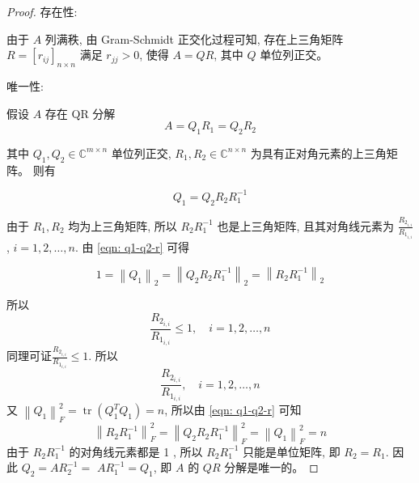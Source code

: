 \begin{proof}
    存在性: 
    
    由于 $A$ 列满秩, 由 Gram-Schmidt 正交化过程可知, 存在上三角矩阵 $R=\left[r_{i j}\right]_{n \times n}$ 满足 $r_{j j}>0$, 使得 $A=Q R$, 其中 $Q$ 单位列正交。

    唯一性: 
    
    假设 $A$ 存在 QR 分解
$$
A=Q_{1} R_{1}=Q_{2} R_{2}
$$

其中 $Q_{1}, Q_{2} \in \mathbb{C}^{m \times n}$ 单位列正交, $R_{1}, R_{2} \in \mathbb{C}^{n \times n}$ 为具有正对角元素的上三角矩阵。 则有

\begin{equation}
    \label{eqn: q1-q2-r}
    Q_{1}=Q_{2} R_{2} R_{1}^{-1}
\end{equation}


由于 $R_{1}, R_{2}$ 均为上三角矩阵, 所以 $R_{2} R_{1}^{-1}$ 也是上三角矩阵, 且其对角线元素为 $\frac{R_{2_{i,i}}}{R_{1_{i,i}}}$, $i=1,2, \ldots, n$. 由 \cref{eqn: q1-q2-r} 可得

$$
1=\left\|Q_{1}\right\|_{2}=\left\|Q_{2} R_{2} R_{1}^{-1}\right\|_{2}=\left\|R_{2} R_{1}^{-1}\right\|_{2}
$$

所以
$$
\frac{R_{2_{i,i}}}{R_{1_{i,i}}} \leq 1, \quad i=1,2, \ldots, n
$$
同理可证$\frac{R_{2_{i,i}}}{R_{1_{i,i}}} \leq 1$. 所以
$$
\frac{R_{2_{i,i}}}{R_{1_{i,i}}}, \quad i=1,2, \ldots, n
$$
又 $\left\|Q_{1}\right\|_{F}^{2}=\operatorname{tr}\left(Q_{1}^{T} Q_{1}\right)=n$, 所以由 \cref{eqn: q1-q2-r} 可知
$$
\left\|R_{2} R_{1}^{-1}\right\|_{F}^{2}=\left\|Q_{2} R_{2} R_{1}^{-1}\right\|_{F}^{2}=\left\|Q_{1}\right\|_{F}^{2}=n
$$
由于 $R_{2} R_{1}^{-1}$ 的对角线元素都是 1 , 所以 $R_{2} R_{1}^{-1}$ 只能是单位矩阵, 即 $R_{2}=R_{1}$. 因此 $Q_{2}=A R_{2}^{-1}=$ $A R_{1}^{-1}=Q_{1}$, 即 $A$ 的 $ {QR}$ 分解是唯一的。

\end{proof}


